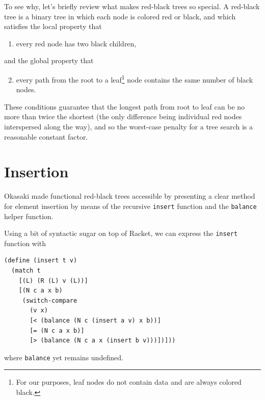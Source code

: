 \documentclass[preprint]{sigplanconf}
\begin{document}
To see why, let's briefly review what makes red-black trees so special. A red-black tree is a binary tree in which each node is colored red or black, and which satisfies the local property that
\begin{enumerate}
\item every red node has two black children,
\end{enumerate}
and the global property that
\begin{enumerate}
\setcounter{enumi}{1}
\item every path from the root to a leaf\footnote{For our purposes, leaf nodes do not contain data and are always colored black.} node contains the same number of black nodes.
\end{enumerate}
These conditions guarantee that the longest path from root to leaf can be no more than twice the shortest (the only difference being individual red nodes interspersed along the way), and so the worst-case penalty for a tree search is a reasonable constant factor.

\section{Insertion}

Okasaki \cite{okasaki1999functional} made functional red-black trees accessible by presenting a clear method for element insertion by means of the recursive \texttt{insert} function and the \texttt{balance} helper function.

Using a bit of syntactic sugar on top of Racket, we can express the \texttt{insert} function with
\begin{verbatim}
(define (insert t v)
  (match t
    [(L) (R (L) v (L))]
    [(N c a x b)
     (switch-compare
       (v x)
       [< (balance (N c (insert a v) x b))]
       [= (N c a x b)]
       [> (balance (N c a x (insert b v)))])]))
\end{verbatim}
where \texttt{balance} yet remains undefined.
\end{document}
